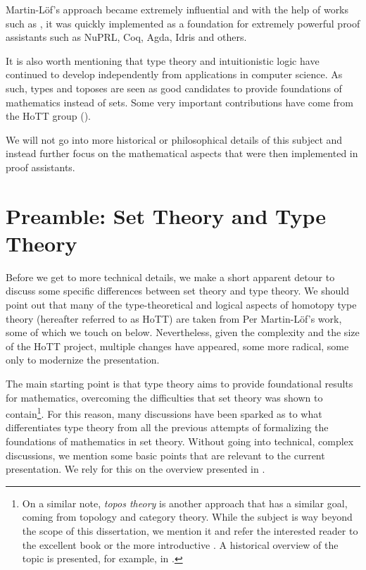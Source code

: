 Martin-L\"of's approach became extremely influential and with the help of
works such as \cite{pmltt}, it was quickly implemented as a foundation for
extremely powerful proof assistants such as NuPRL, Coq, Agda, Idris and others.

It is also worth mentioning that type theory and intuitionistic logic have
continued to develop independently from applications in computer science.
As such, types and toposes are seen as good candidates to provide
 foundations of mathematics instead of sets. Some very important
contributions have come from the HoTT group (\cite{hott}).

We will not go into more historical or philosophical details of this subject
and instead further focus on the mathematical aspects that were then
implemented in proof assistants.

\section{Preamble: Set Theory and Type Theory}

\indent\indent Before we get to more technical details, we make a short apparent
detour to discuss some specific differences between set theory and type theory.
We should point out that many of the type-theoretical and logical aspects of
homotopy type theory (hereafter referred to as HoTT) are taken from Per
Martin-L\"{o}f's work, some of which we touch on below.
Nevertheless, given the complexity and the size of the HoTT project, multiple
changes have appeared, some more radical, some only to modernize the
presentation.

The main starting point is that type theory aims to provide foundational
results for mathematics, overcoming the difficulties that set theory was shown
to contain\footnote{On a similar note, \emph{topos theory} is another approach
  that has a similar goal, coming from topology and category theory. While the
  subject is way beyond the scope of this dissertation, we mention it and refer
  the interested reader to the excellent book \cite{macsh} or the more introductive
  \cite{goldb}. A historical overview of the topic is presented, for example,
  in \cite{abuse}.}. For this reason, many discussions have been sparked as to
what differentiates type theory from all the previous attempts of formalizing the
foundations of mathematics in set theory. Without going into technical,
complex discussions, we mention some basic points that are relevant to the
current presentation. We rely for this on the overview presented in
\cite[\S 1.1]{hott}.

